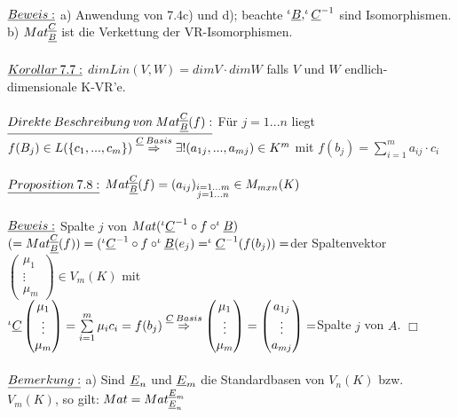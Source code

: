 \documentclass[fleqn, a4paper, 11pt]{article}
\begin{document}
\\
$\uline{Beweis:}$ a) Anwendung von 7.4c) und d); beachte $^\iota\uline{B},^\iota\uline{C}^{-1}$ sind Isomorphismen.\\
b) $Mat_{\uline{B}}^{\uline{C}}$ ist die Verkettung der VR-Isomorphismen.\\
\\
$\uline{Korollar\:7.7:}$ $dim Lin(V,W)=dim V\cdot dim W$ falls $V$ und $W$ endlich-dimensionale K-VR'e.\\
\\
$\uline{Direkte\:Beschreibung\:von\:Mat_{\uline{B}}^{\uline{C}}(f):}$ F\"ur $j=1...n$ liegt $f(B_j)\in L(\{c_1,...,c_m\})\stackrel{\uline{C}\:Basis}{\Rightarrow}\exists !(a_{1j},...,a_{mj})\in K^m$ mit $f(b_j)=\sum\limits_{i=1}^m a_{ij}\cdot c_i$\\
\\
$\uline{Proposition\:7.8:}$ $Mat_{\uline{B}}^{\uline{C}}(f)=(a_{ij})_{\substack{i=1...m\\j=1...n}}\in M_{mxn}(K)$\\
\\
$\uline{Beweis:}$ Spalte $j$ von $Mat(^\iota\uline{C}^{-1}\circ f\circ ^\iota\uline{B})$ $(=Mat_{\uline{B}}^{\uline{C}}(f))=(^\iota\uline{C}^{-1}\circ f\circ ^\iota\uline{B}(e_j)=^\iota\uline{C}^{-1}(f(b_j))=$der Spaltenvektor $\begin{pmatrix}
	\mu_1\\
	\vdots\\
	\mu_m
\end{pmatrix}\in V_m(K)$ mit $^\iota\uline{C}\begin{pmatrix}
	\mu_1\\
	\vdots\\
	\mu_m
\end{pmatrix}=\sum\limits_{i=1}^m \mu_i c_i=f(b_j)\stackrel{\uline{C}\:Basis}{\Rightarrow}\begin{pmatrix}
	\mu_1\\
	\vdots\\
	\mu_m
\end{pmatrix}=\begin{pmatrix}
	a_{1j}\\
	\vdots\\
	a_{mj}
\end{pmatrix}=$Spalte $j$ von $A$. \hfill $\Box$\\
\\
$\uline{Bemerkung:}$ a) Sind $\uline{E}_n$ und $\uline{E}_m$ die Standardbasen von $V_n(K)$ bzw. $V_m(K)$, so gilt: $Mat=Mat_{\uline{E}_n}^{\uline{E}_m}$\\
\end{document}
